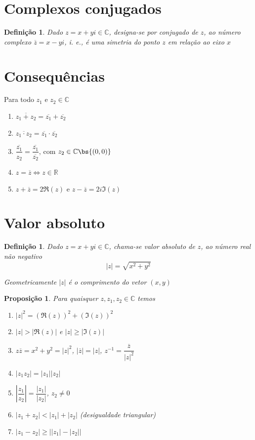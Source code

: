 \documentclass[12pt, oneside, a4paper, english, brazil]{abntex2}
\providecommand{\abs}[1]{\left\vert #1 \right\vert}
\newcommand{\C}{\mathbb{C}}
\newcounter{geral}
\theoremstyle{normal}
\newtheorem{definition}[geral]{Definição}
\newtheorem{proposition}[geral]{Proposição}
\theoremstyle{observacao}
\begin{document}
\section{Complexos conjugados}

\begin{definition}
Dado $z = x + yi \in \C$, designa-se por conjugado de $z$, ao número complexo $\overline{z}=x-yi$, i. e., é uma simetria do ponto $z$ em relação ao eixo $x$
\end{definition}

\section*{Consequências}
Para todo $z_1$ e $z_2 \in \C$
\begin{enumerate}
\item $\overline{z_1+z_2} = \overline{z_1}+\overline{z_2}$
\item $\overline{z_1\cdot z_2} = \overline{z_1}\cdot \overline{z_2}$
\item $\overline{\dfrac{z_1}{z_2}} = \dfrac{\overline{z_1}}{\overline{z_2}}$, com $z_2 \in \C \bs \{(0,0)\}$
\item $z=\overline{z} \Leftrightarrow z \in \mathbb{R}$
\item $z+\overline{z}= 2\mathfrak{R}(z) \text{ e } z - \overline{z}=2i\mathfrak{I}(z)$
\end{enumerate}

\section{Valor absoluto}

\begin{definition}
Dado $z= x+yi \in \C$, chama-se valor absoluto de $z$, ao número real não negativo
\[
\abs{z}= \sqrt{x^2+y^2}
\]

Geometricamente $\abs{z}$ é o comprimento do vetor $(x,y)$
\end{definition}

\begin{proposition}
Para quaisquer $z, z_1, z_2 \in \C$ temos \label{prop9}
\begin{enumerate}
\item $\abs{z}^2 = (\mathfrak{R}(z))^2+(\mathfrak{I}(z))^2$
\item $\abs{z}> \abs{\mathfrak{R}(z)}$ e $\abs{z} \geq \abs{\mathfrak{I}(z)}$
\item $z\overline{z}=x^2+y^2=\abs{z}^2$, $\abs{\overline{z}}=\abs{z}$, $z^{-1} = \dfrac{\overline{z}}{\abs{z}^2}$
\item $\abs{z_1z_2}=\abs{z_1}\abs{z_2}$
\item $\abs{\dfrac{z_1}{z_2}}=\dfrac{\abs{z_1}}{\abs{z_2}}$, $z_2 \neq 0$
\item $\abs{z_1+z_2}<\abs{z_1}+\abs{z_2}$ (desigualdade triangular)
\item $\abs{z_1-z_2}\geq \abs{\abs{z_1}-\abs{z_2}}$
\end{enumerate}
\end{proposition}
\end{document}
